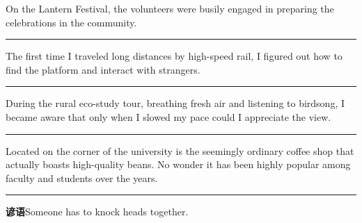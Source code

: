 \documentclass[11pt,a4paper]{article}
\newcommand{\num}[1]{\makebox[1.9em][r]{#1.}\hspace{0.3em}}
\newcommand{\wline}{\noindent\rule{\linewidth}{0.4pt}}
\begin{document}
\vspace{0.35em}\vspace{0.15em}

\begin{minipage}{\linewidth}

\num{31}On the Lantern Festival, the volunteers were busily engaged in preparing the celebrations in the community.

\vspace{0.25em}

\wline

\end{minipage}

\begin{minipage}{\linewidth}

\num{32}The first time I traveled long distances by high-speed rail, I figured out how to find the platform and interact with strangers.

\vspace{0.25em}

\wline

\end{minipage}

\begin{minipage}{\linewidth}

\num{33}During the rural eco-study tour, breathing fresh air and listening to birdsong, I became aware that only when I slowed my pace could I appreciate the view.

\vspace{0.25em}

\wline

\end{minipage}

\begin{minipage}{\linewidth}

\num{34}Located on the corner of the university is the seemingly ordinary coffee shop that actually boasts high-quality beans. No wonder it has been highly popular among faculty and students over the years.

\vspace{0.25em}

\wline

\end{minipage}

\num{35}\textbf{谚语}\quad Someone has to knock heads together.

\vspace{0.25em}
\end{document}
